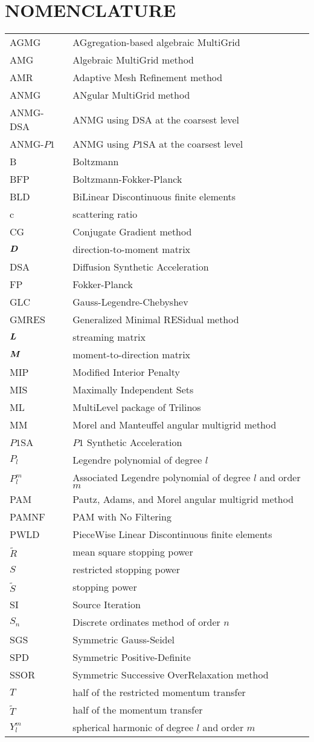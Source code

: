 \chapter*{NOMENCLATURE}

\begin{xtabular}{ll}
      AGMG & AGgregation-based algebraic MultiGrid \tabularnewline
       AMG & Algebraic MultiGrid method \tabularnewline
       AMR & Adaptive Mesh Refinement method \tabularnewline
      ANMG & ANgular MultiGrid method \tabularnewline
  ANMG-DSA & ANMG using DSA at the coarsest level \tabularnewline
 ANMG-$P1$ & ANMG using $P1$SA at the coarsest level \tabularnewline
         B & Boltzmann \tabularnewline
       BFP & Boltzmann-Fokker-Planck \tabularnewline
       BLD & BiLinear Discontinuous finite elements \tabularnewline
         c & scattering ratio \tabularnewline
        CG & Conjugate Gradient method \tabularnewline
  $\boldsymbol{D}$ & direction-to-moment matrix \tabularnewline
       DSA & Diffusion Synthetic Acceleration \tabularnewline
        FP & Fokker-Planck \tabularnewline
       GLC & Gauss-Legendre-Chebyshev \tabularnewline
     GMRES & Generalized Minimal RESidual method \tabularnewline
  $\boldsymbol{L}$ & streaming matrix \tabularnewline
  $\boldsymbol{M}$ & moment-to-direction matrix \tabularnewline
       MIP & Modified Interior Penalty \tabularnewline
       MIS & Maximally Independent Sets \tabularnewline
        ML & MultiLevel package of Trilinos \tabularnewline
        MM & Morel and Manteuffel angular multigrid method \tabularnewline
    $P1$SA & $P1$ Synthetic Acceleration \tabularnewline
     $P_l$ & Legendre polynomial of degree $l$ \tabularnewline
   $P_l^m$ & Associated Legendre polynomial of degree $l$ and order $m$
  \tabularnewline
       PAM & Pautz, Adams, and Morel angular multigrid method \tabularnewline
     PAMNF & PAM with No Filtering \tabularnewline
      PWLD & PieceWise Linear Discontinuous finite elements \tabularnewline
  $\tilde{R}$ & mean square stopping power \tabularnewline
       $S$ & restricted stopping power \tabularnewline
  $\tilde{S}$ & stopping power \tabularnewline
        SI & Source Iteration \tabularnewline
     $S_n$ & Discrete ordinates method of order $n$ \tabularnewline
     SGS   & Symmetric Gauss-Seidel \tabularnewline
       SPD & Symmetric Positive-Definite \tabularnewline
      SSOR & Symmetric Successive OverRelaxation method \tabularnewline
       $T$ & half of the restricted momentum transfer \tabularnewline
$\tilde{T}$ & half of the momentum transfer \tabularnewline
   $Y_l^m$ & spherical harmonic of degree $l$ and order $m$ \tabularnewline 

\end{xtabular}
